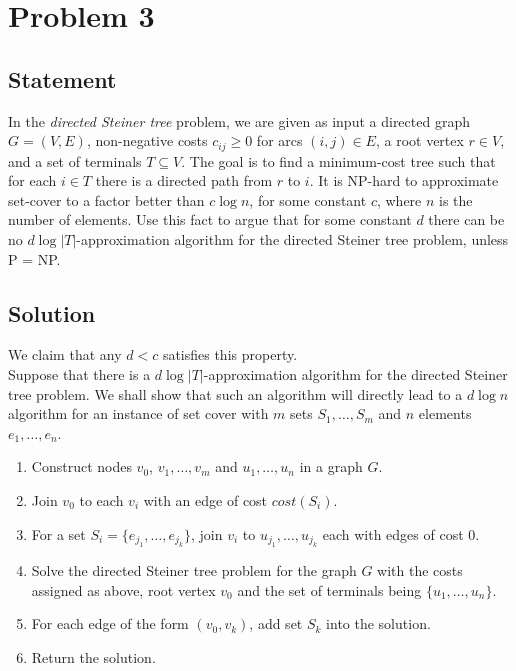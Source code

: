 \documentclass[a4paper]{article}
\newcommand{\nl}{\vspace{0.2cm}\\}
\newcommand{\eps}{\varepsilon}
\begin{document}


\newpage

\section{Problem 3}
\subsection{Statement}
In the \emph{directed Steiner tree} problem, we are given as input a directed graph $G = (V, E)$, non-negative costs $c_{ij} \ge 0$ for arcs $(i, j) \in E$, a root vertex $r \in V$, and a set of
terminals $T \subseteq V$. The goal is to find a minimum-cost tree such that for each $i\in T$ there is a directed path from $r$ to $i$. It is NP-hard to approximate set-cover to a factor better than
$c\log n$, for some constant $c$, where $n$ is the number of elements. Use this fact to argue that for some constant $d$ there can be no $d \log |T|$-approximation algorithm for the directed Steiner tree problem, unless P = NP.
\subsection{Solution}
We claim that any $d < c$ satisfies this property.\nl
Suppose that there is a $d \log |T|$-approximation algorithm for the directed Steiner tree problem. We shall show that such an algorithm will directly lead to a $d \log n$ algorithm for an instance of
set cover with $m$ sets $S_1, \ldots, S_m$ and $n$ elements $e_1, \ldots, e_n$.
\begin{enumerate}
    \item Construct nodes $v_0$, $v_1, \ldots, v_m$ and $u_1, \ldots, u_n$ in a graph $G$.
    \item Join $v_0$ to each $v_i$ with an edge of cost $cost(S_i)$.
    \item For a set $S_i = \{e_{j_1}, \ldots, e_{j_k}\}$, join $v_i$ to $u_{j_1}, \ldots, u_{j_k}$ each with edges of cost $0$.
    \item Solve the directed Steiner tree problem for the graph $G$ with the costs assigned as above, root vertex $v_0$ and the set of terminals being $\{u_1, \ldots, u_n\}$.
    \item For each edge of the form $(v_0, v_k)$, add set $S_k$ into the solution.
    \item Return the solution.
\end{enumerate}
\end{document}
